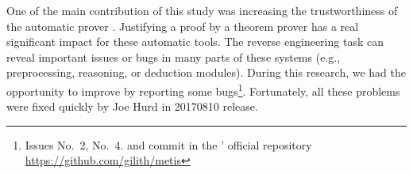 \documentclass[../main.tex]{subfiles}
\begin{document}
One of the main contribution of this study was
increasing the trustworthiness of the automatic prover \Metis.
Justifying a proof by a theorem prover
has a real significant impact for these automatic tools.
The reverse engineering task can reveal important issues or bugs
in many parts of these systems (e.g., preprocessing, reasoning, or
deduction modules). During this research, we had the opportunity
to improve \Metis by reporting some bugs\footnote{Issues No.~2,
No.~4. and commit  in the \Metis' official repository
\url{https://github.com/gilith/metis}}.
Fortunately, all these problems were fixed quickly by Joe Hurd in
20170810 release.
\end{document}
